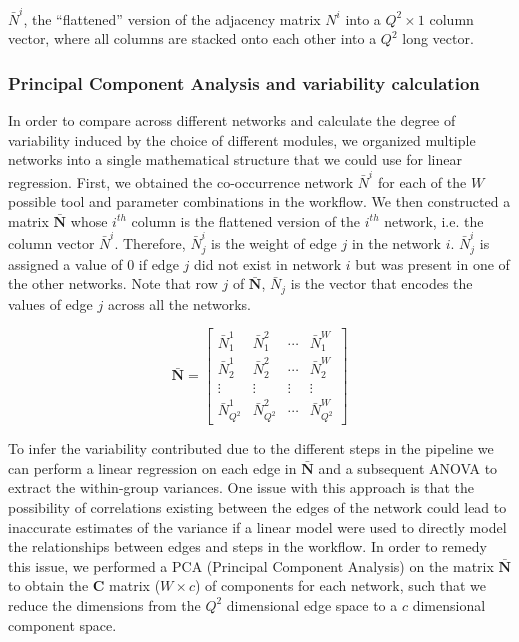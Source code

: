   $\bar{N}^i$, the ``flattened'' version of the adjacency matrix $N^i$ into a $Q^2 \times 1$ column vector, where all columns are stacked onto each other into a $Q^2$ long vector.


  \subsubsection*{Principal Component Analysis and variability calculation}
  \vspace{-5mm}
   In order to compare across different networks and calculate the degree of variability induced by the choice of different modules, we organized multiple networks into a single mathematical structure that we could use for linear regression.
   First, we obtained the co-occurrence network $\bar{N}^i$ for each of the $W$ possible tool and parameter combinations in the workflow.
   We then constructed a matrix $\mathbf{\bar{N}}$ whose $i^{th}$ column is the flattened version of the $i^{th}$ network, i.e. the column vector $\bar{N}^i$.
   Therefore, $\bar{N}^i_j$ is the weight of edge $j$ in the network $i$.
   $\bar{N}^i_j$ is assigned a value of 0 if edge $j$ did not exist in network $i$ but was present in one of the other networks.
   Note that row $j$ of $\mathbf{\bar{N}}$, $\bar{N}_j$ is the vector that encodes the values of edge $j$ across all the networks.

  \begin{equation*}
   \mathbf{\bar{N}} =
      \begin{bmatrix}
       \bar{N}^1_1 & \bar{N}^2_1 & \cdots  & \bar{N}^{W}_1  \\
       \bar{N}^1_2 & \bar{N}^2_2 & \cdots  & \bar{N}^{W}_2 \\
       \vdots & \vdots & \vdots  & \vdots \\
       \bar{N}^1_{Q^2} & \bar{N}^2_{Q^2} & \cdots  & \bar{N}^{W}_{Q^2}
      \end{bmatrix}
  \end{equation*}

  To infer the variability contributed due to the different steps in the pipeline we can perform a linear regression on each edge in $\mathbf{\bar{N}}$ and a subsequent ANOVA to extract the within-group variances.
  One issue with this approach is that the possibility of correlations existing between the edges of the network could lead to inaccurate estimates of the variance if a linear model were used to directly model the relationships between edges and steps in the workflow.
  In order to remedy this issue, we performed a PCA (Principal Component Analysis) on the matrix $\mathbf{\bar{N}}$ to obtain the $\mathbf{C}$ matrix ($W \times c$) of components for each network, such that we reduce the dimensions from the $Q^2$ dimensional edge space to a $c$ dimensional component space.


